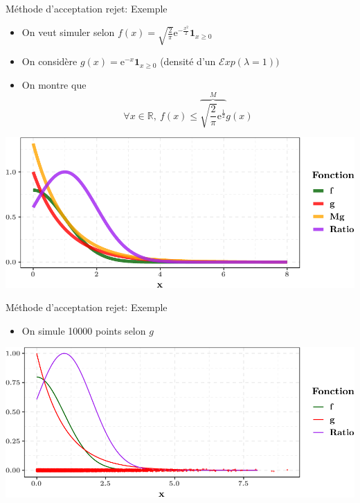 \documentclass[ignorenonframetext,]{beamer}
\providecommand{\tightlist}{%
  \setlength{\itemsep}{0pt}\setlength{\parskip}{0pt}}
\newcommand{\R}{\mathbb{R}}
\begin{document}
\begin{frame}{Méthode d'acceptation rejet: Exemple}
\protect\hypertarget{muxe9thode-dacceptation-rejet-exemple}{}

\begin{itemize}
\tightlist
\item
  On veut simuler selon
  \(f(x) = \sqrt{\frac{2}{\pi}}\text{e}^{-\frac{x^2}{2}}\mathbf{1}_{x \geq 0}\)
\item
  On considère \(g(x) = \text{e}^{-x}\mathbf{1}_{x \geq 0}\) (densité
  d'un \(\mathcal{E}xp(\lambda = 1) )\)\\
\item
  On montre que
  \[\forall x \in \R,~f(x) \leq \overbrace{\sqrt{\frac{2}{\pi}} \text{e}^{\frac{1}{2}}}^Mg(x)\]
\end{itemize}

\includegraphics{diapos_simulation_variables_aleatoires_files/figure-beamer/plot_function-1.pdf}

\end{frame}

\begin{frame}{Méthode d'acceptation rejet: Exemple}
\protect\hypertarget{muxe9thode-dacceptation-rejet-exemple-1}{}

\begin{itemize}
\tightlist
\item
  On simule 10000 points selon \(g\)
\end{itemize}

\includegraphics{diapos_simulation_variables_aleatoires_files/figure-beamer/plot_simulated-1.pdf}

\end{frame}
\end{document}
